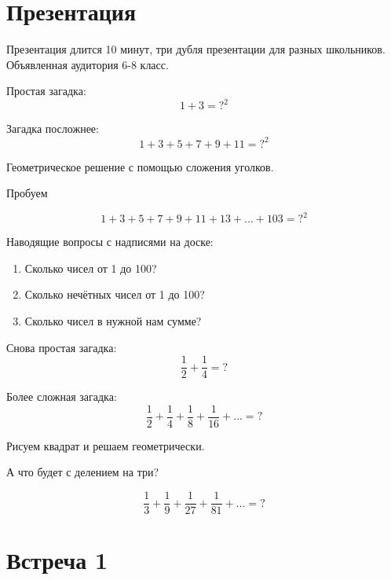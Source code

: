 \documentclass[a4paper, 12pt]{article}
\begin{document}
\section{Презентация}

Презентация длится 10 минут, три дубля презентации для разных школьников. 
Объявленная аудитория 6-8 класс.

Простая загадка:
\[
   1 + 3 = ?^2
\]

Загадка посложнее:
\[
 1 + 3 + 5 + 7 + 9 + 11 = ?^2
\]

Геометрическое решение с помощью сложения уголков.

Пробуем 

\[
 1 + 3 + 5 + 7 + 9 + 11 + 13 + \ldots + 103 = ?^2
\]

Наводящие вопросы с надписями на доске:
\begin{enumerate}
  \item Сколько чисел от 1 до 100?
  \item Сколько нечётных чисел от 1 до 100?
  \item Сколько чисел в нужной нам сумме?
\end{enumerate}


Снова простая загадка:
\[
  \frac{1}{2} + \frac{1}{4} = ?
\]


Более сложная загадка:
\[
  \frac{1}{2} + \frac{1}{4} + \frac{1}{8} + \frac{1}{16} + \ldots = ?
\]


Рисуем квадрат и решаем геометрически.

А что будет с делением на три?

\[
  \frac{1}{3} + \frac{1}{9} + \frac{1}{27} + \frac{1}{81} + \ldots = ?
\]




\section{Встреча 1}
\end{document}
